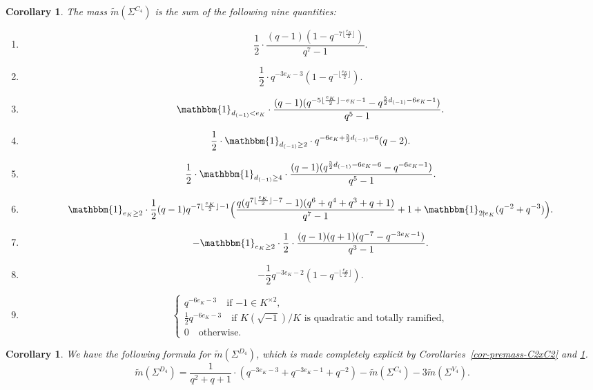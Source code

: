 \documentclass[11pt]{amsart}
\theoremstyle{theorem}
\newtheorem{corollary}[theorem]{Corollary}
\theoremstyle{example}
\theoremstyle{definition}
\numberwithin{theorem}{section}
\numberwithin{theorem}{section}
\newcommand{\m}{\widetilde{m}}
\begin{document}
\begin{corollary}
    \label{cor-premass-of-Sigma-C4}
    The mass 
    $
    \widetilde{m}(\Sigma^{C_4})
    $
    is the sum of the following nine quantities:
    \begin{enumerate}
        \item $$
        \frac{1}{2}\cdot \frac{(q-1)(1 - q^{-7\lfloor \frac{e_K}{2}\rfloor})}{q^7 - 1}.
        $$
        \item $$
        \frac{1}{2}\cdot q^{-3e_K - 3}(1 - q^{
                - \lfloor \frac{e_K}{2}\rfloor
            }).
        $$
        \item $$
        \mathbbm{1}_{d_{(-1)} < e_K}\cdot \frac{(q-1)(q^{-5\lfloor\frac{e_K}{2}\rfloor - e_K - 1} - q^{\frac{5}{2} d_{(-1)} - 6e_K - 1})}{q^5-1}.
        $$
        \item $$
        \frac{1}{2}\cdot \mathbbm{1}_{d_{(-1)} \geq 2}\cdot q^{-6e_K + \frac{5}{2}d_{(-1)} - 6}(q-2).     
    $$
    \item $$
    \frac{1}{2} \cdot \mathbbm{1}_{d_{(-1)}\geq 4}\cdot \frac{(q-1)(q^{\frac{5}{2}d_{(-1)} - 6e_K - 6} - q^{-6e_K-1})}{q^5-1}.
    $$
    \item $$\mathbbm{1}_{e_K\geq 2}\cdot \frac{1}{2}(q-1)q^{- 7\lfloor \frac{e_K}{2}\rfloor - 1}\Big(
        \frac{q(q^{7\lfloor \frac{e_K}{2}\rfloor - 7} - 1)(q^6 + q^4 + q^3 + q + 1)}{q^7-1} + 1 + \mathbbm{1}_{2\nmid e_K}(q^{-2} + q^{-3})    
    \Big).$$
    \item $$
    -\mathbbm{1}_{e_K \geq 2}\cdot \frac{1}{2}\cdot\frac{(q-1)(q+1)(q^{-7} - q^{-3e_K - 1})}{q^3-1}.
    $$
    \item $$
    - \frac{1}{2}q^{-3e_K - 2}(1 - q^{-\lfloor\frac{e_K}{2}\rfloor}).
    $$
    \item $$
        \begin{cases}
            q^{-6e_K - 3} \quad\text{if $-1 \in K^{\times 2}$},
            \\
            \frac{1}{2}q^{-6e_K-3}\quad\text{if $K(\sqrt{-1})/K$ is quadratic and totally ramified},
            \\
            0 \quad\text{otherwise}. 
        \end{cases}
    $$
    \end{enumerate}
\end{corollary}

\begin{corollary}
    \label{cor-premass-of-D4}
    We have the following formula for $\m(\Sigma^{D_4})$, which is made completely explicit by Corollaries~\ref{cor-premass-C2xC2} and \ref{cor-premass-of-Sigma-C4}. 
    $$
    \m(\Sigma^{D_4}) = \frac{1}{q^2+q+1} \cdot (q^{-3e_K - 3} + q^{-3e_K - 1} + q^{-2}) - \m(\Sigma^{C_4}) - 3\m(\Sigma^{V_4}).
    $$
\end{corollary}
\end{document}
